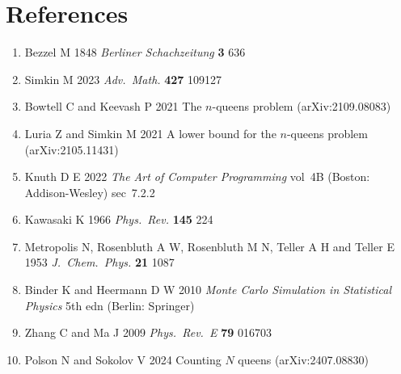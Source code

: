 \documentclass{iopjournal}
\begin{document}
\section*{References}

\begin{enumerate}
\renewcommand{\labelenumi}{[\theenumi]}

\item Bezzel M 1848 \textit{Berliner Schachzeitung} \textbf{3} 636

\item Simkin M 2023 \textit{Adv.\ Math.} \textbf{427} 109127

\item Bowtell C and Keevash P 2021 The $n$-queens problem
  (arXiv:2109.08083)

\item Luria Z and Simkin M 2021 A lower bound for the $n$-queens
  problem (arXiv:2105.11431)

\item Knuth D E 2022 \textit{The Art of Computer Programming}
  vol~4B (Boston: Addison-Wesley) sec~7.2.2

\item Kawasaki K 1966 \textit{Phys.\ Rev.} \textbf{145} 224

\item Metropolis N, Rosenbluth A W, Rosenbluth M N, Teller A H
  and Teller E 1953 \textit{J.\ Chem.\ Phys.} \textbf{21} 1087

\item Binder K and Heermann D W 2010 \textit{Monte Carlo
  Simulation in Statistical Physics} 5th edn (Berlin: Springer)

\item Zhang C and Ma J 2009 \textit{Phys.\ Rev.\ E} \textbf{79}
  016703

\item Polson N and Sokolov V 2024 Counting $N$ queens
  (arXiv:2407.08830)

\end{enumerate}
\end{document}
